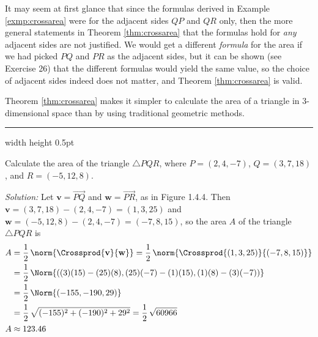 It may seem at first glance that since the formulas derived in Example \ref{exmp:crossarea} were for the adjacent
sides $QP$ and $QR$ only, then the more general statements in Theorem \ref{thm:crossarea} that the formulas hold for
\emph{any} adjacent sides are not justified. We would get a different \emph{formula} for the area if we had
picked $PQ$ and $PR$ as the adjacent sides, but it can be shown (see Exercise 26) that the different formulas would
yield the same value, so the choice of adjacent sides indeed does not matter, and
Theorem \ref{thm:crossarea} is valid.

Theorem \ref{thm:crossarea} makes it simpler to calculate the area of a triangle in 3-dimensional space than by using
traditional geometric methods.

\vspace{4mm}
\hrule width \textwidth height 0.5pt
\begin{exmp}
 Calculate the area of the triangle $\triangle PQR$, where $P = (2,4,-7)$, $Q = (3,7,18)$, and
 $R =(-5,12,8)$.\vspace{1mm}
 \piccaption[]{}
 \par\noindent\emph{Solution:} Let $\textbf{v} = \overrightarrow{PQ}$ and $\textbf{w} = \overrightarrow{PR}$, as in
 Figure 1.4.4. Then $\textbf{v} = (3,7,18) - (2,4,-7) = (1,3,25)$ and $\textbf{w} = (-5,12,8) - (2,4,-7) = (-7,8,15)$,
 so the area $A$ of the triangle $\triangle PQR$ is
 \begin{align*}
 A &= \frac{1}{2}\,\norm{\Crossprod{\textbf{v}}{\textbf{w}}} = \frac{1}{2}\,\norm{\Crossprod{(1,3,25)}{(-7,8,15)}}\\
 &= \frac{1}{2}\,\Norm{((3)(15) - (25)(8), (25)(-7) - (1)(15), (1)(8) - (3)(-7))}\\
 &= \frac{1}{2}\,\Norm{(-155, -190, 29)}\\
 &= \frac{1}{2}\,\sqrt{(-155)^2 + (-190)^2 + 29^2} = \frac{1}{2}\,\sqrt{60966}\\
 A &\approx 123.46
 \end{align*}
 \end{exmp}
